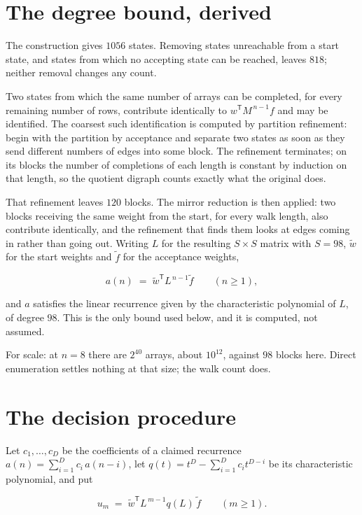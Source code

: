 \documentclass[11pt]{article}
\theoremstyle{definition}
\begin{document}
\section{The degree bound, derived}

The construction gives $1056$ states. Removing states unreachable from a start state, and states from which no accepting state can be reached, leaves $818$; neither removal changes any count.

Two states from which the same number of arrays can be completed, for every remaining number of rows, contribute identically to $w^{\mathsf T}M^{\,n-1}f$ and may be identified. The coarsest such identification is computed by partition refinement: begin with the partition by acceptance and separate two states as soon as they send different numbers of edges into some block. The refinement terminates; on its blocks the number of completions of each length is constant by induction on that length, so the quotient digraph counts exactly what the original does.

That refinement leaves $120$ blocks. The mirror reduction is then applied: two blocks receiving the same weight from the start, for every walk length, also contribute identically, and the refinement that finds them looks at edges coming in rather than going out. Writing $L$ for the resulting $S \times S$ matrix with $S = 98$, $\tilde w$ for the start weights and $\tilde f$ for the acceptance weights,

\[a(n) \;=\; \tilde w^{\mathsf T} L^{\,n-1} \tilde f \qquad (n \ge 1),\]

and $a$ satisfies the linear recurrence given by the characteristic polynomial of $L$, of degree $98$. This is the only bound used below, and it is computed, not assumed.

For scale: at $n = 8$ there are $2^{40}$ arrays, about $10^{12}$, against $98$ blocks here. Direct enumeration settles nothing at that size; the walk count does.

\section{The decision procedure}

Let $c_1,\dots,c_D$ be the coefficients of a claimed recurrence $a(n) = \sum_{i=1}^{D} c_i\,a(n-i)$, let $q(t) = t^{D} - \sum_{i=1}^{D} c_i t^{D-i}$ be its characteristic polynomial, and put

\[u_m \;=\; \tilde w^{\mathsf T} L^{\,m-1} q(L)\,\tilde f \qquad (m \ge 1).\]
\end{document}
